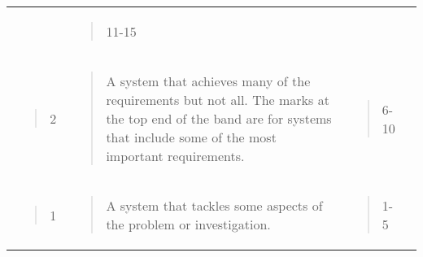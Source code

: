 \documentclass[
]{article}
\begin{document}
\begin{longtable}[]{@{}llll@{}}
\begin{minipage}[t]{0.22\columnwidth}
\end{minipage} & \begin{minipage}[t]{0.22\columnwidth}\raggedright
\begin{quote}
11-15
\end{quote}\strut
\end{minipage} & \begin{minipage}[t]{0.22\columnwidth}\raggedright
\strut
\end{minipage}\tabularnewline
\begin{minipage}[t]{0.22\columnwidth}\raggedright
\begin{quote}
2
\end{quote}\strut
\end{minipage} & \begin{minipage}[t]{0.22\columnwidth}\raggedright
\begin{quote}
A system that achieves many of the requirements but not all. The marks
at the top end of the band are for systems that include some of the most
important requirements.
\end{quote}\strut
\end{minipage} & \begin{minipage}[t]{0.22\columnwidth}\raggedright
\begin{quote}
6-10
\end{quote}\strut
\end{minipage} & \begin{minipage}[t]{0.22\columnwidth}\raggedright
\strut
\end{minipage}\tabularnewline
\begin{minipage}[t]{0.22\columnwidth}\raggedright
\begin{quote}
1
\end{quote}\strut
\end{minipage} & \begin{minipage}[t]{0.22\columnwidth}\raggedright
\begin{quote}
A system that tackles some aspects of the problem or investigation.
\end{quote}\strut
\end{minipage} & \begin{minipage}[t]{0.22\columnwidth}\raggedright
\begin{quote}
1-5
\end{quote}\strut
\end{minipage} & \begin{minipage}[t]{0.22\columnwidth}\raggedright
\strut
\end{minipage}\tabularnewline

\end{longtable}
\end{document}
